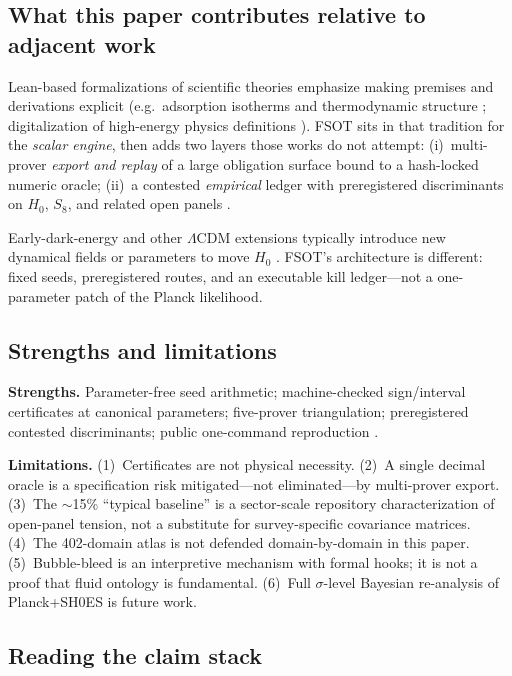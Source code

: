 \documentclass[11pt,a4paper]{article}
\begin{document}
\subsection{What this paper contributes relative to adjacent work}

Lean-based formalizations of scientific theories emphasize making premises and
derivations explicit (e.g.\ adsorption isotherms and thermodynamic structure
\cite{Bobbin2024}; digitalization of high-energy physics definitions
\cite{HepLean2024}).
FSOT sits in that tradition for the \emph{scalar engine}, then adds two layers
those works do not attempt: (i)~multi-prover \emph{export and replay} of a large
obligation surface bound to a hash-locked numeric oracle; (ii)~a contested
\emph{empirical} ledger with preregistered discriminants on $H_0$, $S_8$, and
related open panels \cite{Planck2018,Riess2022,Freedman2019,DESY3,PoulinEDE}.

Early-dark-energy and other $\Lambda$CDM extensions typically introduce new
dynamical fields or parameters to move $H_0$ \cite{PoulinEDE}.
FSOT's architecture is different: fixed seeds, preregistered routes, and an
executable kill ledger---not a one-parameter patch of the Planck likelihood.

\subsection{Strengths and limitations}

\textbf{Strengths.}
Parameter-free seed arithmetic; machine-checked sign/interval certificates at
canonical parameters; five-prover triangulation; preregistered contested
discriminants; public one-command reproduction \cite{FSOT21Lean}.

\textbf{Limitations.}
(1)~Certificates are not physical necessity.
(2)~A single decimal oracle is a specification risk mitigated---not
eliminated---by multi-prover export.
(3)~The $\sim$15\% ``typical baseline'' is a sector-scale repository
characterization of open-panel tension, not a substitute for survey-specific
covariance matrices.
(4)~The 402-domain atlas is not defended domain-by-domain in this paper.
(5)~Bubble-bleed is an interpretive mechanism with formal hooks; it is not a
proof that fluid ontology is fundamental.
(6)~Full $\sigma$-level Bayesian re-analysis of Planck+SH0ES is future work.

\subsection{Reading the claim stack}
\end{document}
